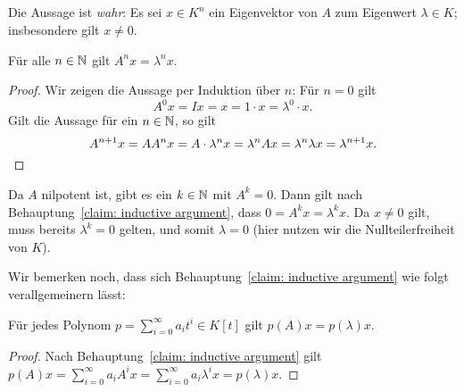\subsection{}
\label{subsection: eigenvalues of nilpotent matrix}

Die Aussage ist \emph{wahr}:
Es sei $x \in K^n$ ein Eigenvektor von $A$ zum Eigenwert $\lambda \in K$;
insbesondere gilt $x \neq 0$.

\begin{claim}
  \label{claim: inductive argument}
  Für alle $n \in \mathbb{N}$ gilt $A^n x = \lambda^n x$.
\end{claim}
\begin{proof}
  Wir zeigen die Aussage per Induktion über $n$:
  Für $n = 0$ gilt
  \[
      A^0 x
    = I x
    = x
    = 1 \cdot x
    = \lambda^0 \cdot x.
  \]
  Gilt die Aussage für ein $n \in \mathbb{N}$, so gilt
  \[
      A^{n+1} x
    = A A^n x
    = A \cdot \lambda^n x
    = \lambda^n A x
    = \lambda^n \lambda x
    = \lambda^{n+1} x.
  \qedhere
  \]
\end{proof}

Da $A$ nilpotent ist, gibt es ein $k \in \mathbb{N}$ mit $A^k = 0$.
Dann gilt nach Behauptung~\ref{claim: inductive argument}, dass $0 = A^k x = \lambda^k x$.
Da $x \neq 0$ gilt, muss bereits $\lambda^k = 0$ gelten, und somit $\lambda = 0$ (hier nutzen wir die Nullteilerfreiheit von $K$).

Wir bemerken noch, dass sich Behauptung~\ref{claim: inductive argument} wie folgt verallgemeinern lässt:

\begin{lemma}
  Für jedes Polynom $p = \sum_{i=0}^\infty a_i t^i \in K[t]$ gilt $p(A) x = p(\lambda) x$.
\end{lemma}

\begin{proof}
  Nach Behauptung~\ref{claim: inductive argument} gilt $p(A) x = \sum_{i=0}^\infty a_i A^i x = \sum_{i=0}^\infty a_i \lambda^i x = p(\lambda) x$.
\end{proof}





\subsection{}
\label{subsection: nonzero nilpotent matrices are not diagonalizable}

